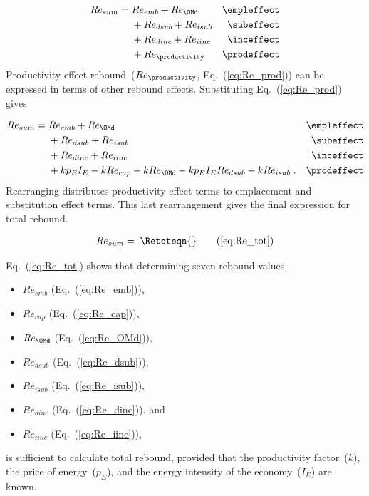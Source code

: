 \begin{align}
  Re_{sum} = \; &Re_{emb} + Re_{\OMd}      & \mathrm{\empleffect} \nonumber \\
                &+ Re_{dsub} + Re_{isub}   & \mathrm{\subeffect}  \nonumber \\
                &+ Re_{dinc} + Re_{iinc}   & \mathrm{\inceffect}  \nonumber \\
                &+ Re_{\productivity}      & \mathrm{\prodeffect}
\end{align}
%
Productivity effect rebound~($Re_{\productivity}$, Eq.~(\ref{eq:Re_prod}))
can be expressed in terms of other rebound effects.
Substituting Eq.~(\ref{eq:Re_prod}) gives

\begin{align}
  Re_{sum} = \; &Re_{emb} + Re_{\OMd}      & \mathrm{\empleffect}       \nonumber \\
                &+ Re_{dsub} + Re_{isub}   & \mathrm{\subeffect}        \nonumber \\
                &+ Re_{dinc} + Re_{iinc}   & \mathrm{\inceffect}        \nonumber \\
                &+ k p_E I_E - k Re_{cap} - k Re_{\OMd} - k p_E I_E Re_{dsub} - k Re_{isub} \; .  & \mathrm{\prodeffect}
\end{align}
%
Rearranging distributes productivity effect terms 
to emplacement and substitution effect terms.
This last rearrangement gives the final expression for total rebound.

\begin{align}
  Re_{sum} = \; \Retoteqn{} \tag{\ref{eq:Re_tot}}
\end{align}

Eq.~(\ref{eq:Re_tot}) shows that determining seven rebound values,

\begin{itemize}

  \item $Re_{emb}$ (Eq.~(\ref{eq:Re_emb})), 

  \item $Re_{cap}$ (Eq.~(\ref{eq:Re_cap})), 
  
  \item $Re_{\OMd}$ (Eq.~(\ref{eq:Re_OMd})),
  
  \item $Re_{dsub}$ (Eq.~(\ref{eq:Re_dsub})),
  
  \item $Re_{isub}$ (Eq.~(\ref{eq:Re_isub})), 
  
  \item $Re_{dinc}$ (Eq.~(\ref{eq:Re_dinc})), and
  
  \item $Re_{iinc}$ (Eq.~(\ref{eq:Re_iinc})),

\end{itemize}
%
is sufficient to calculate total rebound, 
provided that 
the productivity factor~($k$),
the price of energy~($p_E$), and
the energy intensity of the economy~($I_E$) 
are known.
